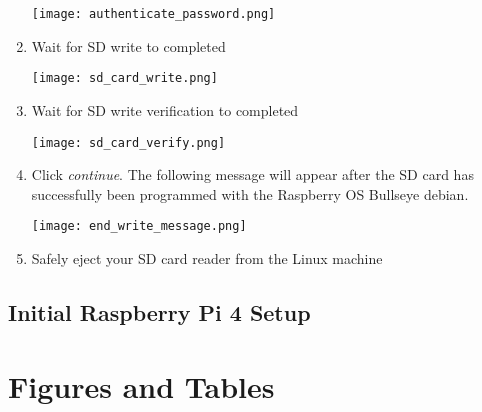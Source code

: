 \documentclass[journal]{IEEEtran}
\begin{document}
\begin{enumerate}
        \texttt{[image: authenticate\_password.png]}

        \item Wait for SD write to completed
        
        \texttt{[image: sd\_card\_write.png]}

        \item Wait for SD write verification to completed
        
        \texttt{[image: sd\_card\_verify.png]}

        \item Click \emph{continue}. The following message will appear after the SD card has successfully been programmed with the Raspberry OS Bullseye debian.
        
        \texttt{[image: end\_write\_message.png]}

        \item Safely eject your SD card reader from the Linux machine 

    \end{enumerate}

    \subsection{Initial Raspberry Pi 4 Setup}

    \section{Figures and Tables}
\end{document}
